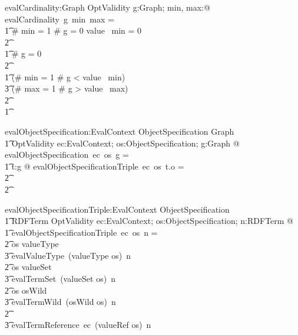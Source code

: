 \begin{gendef}
   evalCardinality:Graph \fun \optional[\nat] \fun \optional[\nat] \fun OptValidity
\where
   \forall g:Graph; min, max:\optional[\nat] @ evalCardinality~g~min~max = \\
   \t1 \IF \# min = 1 \land \# g = 0 \land  value~ min = 0 \\
\t2 \THEN \nomatch \\
\t1 \ELSE \IF \# g = 0 \\
\t2 \THEN \none \\
\t1 \ELSE \IF (\# min = 1 \land \# g < value~ min) \lor \\
\t3 (\# max = 1 \land \# g > value~ max) \\
\t2 \THEN \fail \\
\t1 \ELSE \pass
\end{gendef}
		

\begin{gendef}
   evalObjectSpecification:EvalContext \fun ObjectSpecification \fun Graph \fun \\
\t1 OptValidity
\where
   \forall ec:EvalContext; os:ObjectSpecification; g:Graph @ \\ evalObjectSpecification~ec~os~g = \\
\t1 \IF \forall t:g @ evalObjectSpecificationTriple~ec~os~t.o = \pass \\
\t2		\THEN \pass \\
\t2		\ELSE \fail
\end{gendef}
		

\begin{gendef}
   evalObjectSpecificationTriple:EvalContext \fun ObjectSpecification \fun \\
\t1 RDFTerm \fun OptValidity
\where
   \forall ec:EvalContext; os:ObjectSpecification; n:RDFTerm @ \\
\t1	evalObjectSpecificationTriple~ec~os~n = \\
\t2 \IF os \in \ran valueType \THEN \\
\t3 evalValueType~(valueType \entryFor os)~n \\
\t2 \ELSE \IF os \in \ran valueSet \THEN \\
\t3 evalTermSet~(valueSet \entryFor os)~n \\
\t2 \ELSE \IF os \in \ran osWild \THEN \\
\t3 evalTermWild~(osWild \entryFor os)~n \\
\t2 \ELSE \\
\t3 evalTermReference~ec~(valueRef \entryFor os)~n
\end{gendef}
		

